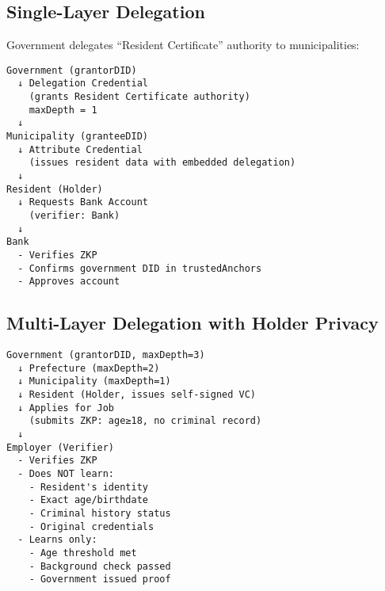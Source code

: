 \subsection{Single-Layer Delegation}

Government delegates ``Resident Certificate'' authority to municipalities:

\begin{center}
\begin{verbatim}
Government (grantorDID)
  ↓ Delegation Credential
    (grants Resident Certificate authority)
    maxDepth = 1
  ↓
Municipality (granteeDID)
  ↓ Attribute Credential
    (issues resident data with embedded delegation)
  ↓
Resident (Holder)
  ↓ Requests Bank Account
    (verifier: Bank)
  ↓
Bank
  - Verifies ZKP
  - Confirms government DID in trustedAnchors
  - Approves account
\end{verbatim}
\end{center}

\subsection{Multi-Layer Delegation with Holder Privacy}

\begin{center}
\begin{verbatim}
Government (grantorDID, maxDepth=3)
  ↓ Prefecture (maxDepth=2)
  ↓ Municipality (maxDepth=1)
  ↓ Resident (Holder, issues self-signed VC)
  ↓ Applies for Job
    (submits ZKP: age≥18, no criminal record)
  ↓
Employer (Verifier)
  - Verifies ZKP
  - Does NOT learn:
    - Resident's identity
    - Exact age/birthdate
    - Criminal history status
    - Original credentials
  - Learns only:
    - Age threshold met
    - Background check passed
    - Government issued proof
\end{verbatim}
\end{center}


